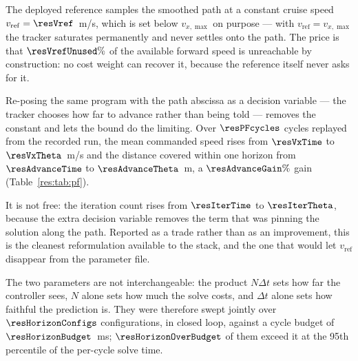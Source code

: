 \label{res:pf}


The deployed reference samples the smoothed path at a constant cruise speed $v_{\mathrm{ref}}=\resVref$~m/s, which is set below $v_{x,\max}$ on purpose --- with $v_{\mathrm{ref}}=v_{x,\max}$ the tracker saturates permanently and never settles onto the path. The price is that $\resVrefUnused\%$ of the available forward speed is unreachable by construction: no cost weight can recover it, because the reference itself never asks for it.

Re-posing the same program with the path abscissa as a decision variable --- the tracker chooses how far to advance rather than being told --- removes the constant and lets the bound do the limiting. Over $\resPFcycles$ cycles replayed from the recorded run, the mean commanded speed rises from $\resVxTime$ to $\resVxTheta$~m/s and the distance covered within one horizon from $\resAdvanceTime$ to $\resAdvanceTheta$~m, a $\resAdvanceGain\%$ gain (Table~\ref{res:tab:pf}).

It is not free: the iteration count rises from $\resIterTime$ to $\resIterTheta$, because the extra decision variable removes the term that was pinning the solution along the path. Reported as a trade rather than as an improvement, this is the cleanest reformulation available to the stack, and the one that would let $v_{\mathrm{ref}}$ disappear from the parameter file.

\begin{table}[htbp]
  \centering
  \small
  \caption{Time-parametrised against path-parametrised reference, averaged over $\resPFcycles$ cycles replayed from the recorded run \resBag.}
  \label{res:tab:pf}
\end{table}

\label{res:horizon}


The two parameters are not interchangeable: the product $N\Delta t$ sets how far the controller sees, $N$ alone sets how much the solve costs, and $\Delta t$ alone sets how faithful the prediction is. They were therefore swept jointly over $\resHorizonConfigs$ configurations, in closed loop, against a cycle budget of $\resHorizonBudget$~ms; $\resHorizonOverBudget$ of them exceed it at the 95th percentile of the per-cycle solve time.

